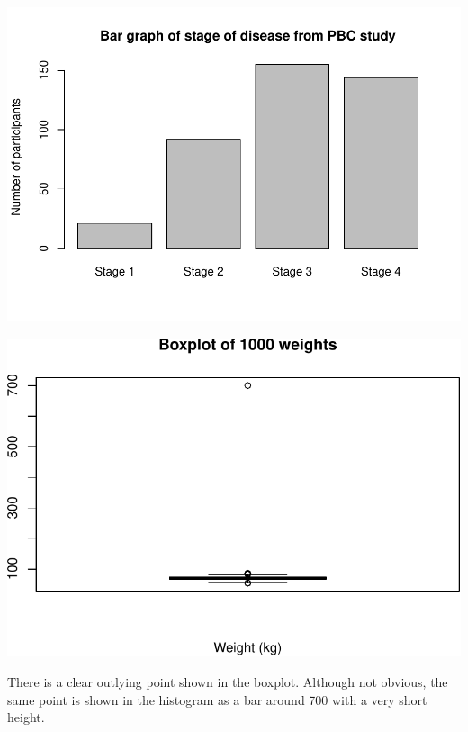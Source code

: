 \documentclass[
]{memoir}
\newenvironment{Shaded}{\begin{snugshade}}{\end{snugshade}}
\newcommand{\AttributeTok}[1]{\textcolor[rgb]{0.77,0.63,0.00}{#1}}
\newcommand{\FunctionTok}[1]{\textcolor[rgb]{0.00,0.00,0.00}{#1}}
\newcommand{\NormalTok}[1]{#1}
\newcommand{\SpecialCharTok}[1]{\textcolor[rgb]{0.00,0.00,0.00}{#1}}
\newcommand{\StringTok}[1]{\textcolor[rgb]{0.31,0.60,0.02}{#1}}
\begin{document}
\includegraphics{phcm9795-R-notes_files/figure-latex/unnamed-chunk-41-1.pdf}

\begin{Shaded}
\end{Shaded}

\includegraphics{phcm9795-R-notes_files/figure-latex/unnamed-chunk-41-2.pdf}

There is a clear outlying point shown in the boxplot. Although not obvious, the same point is shown in the histogram as a bar around 700 with a very short height.
\end{document}
